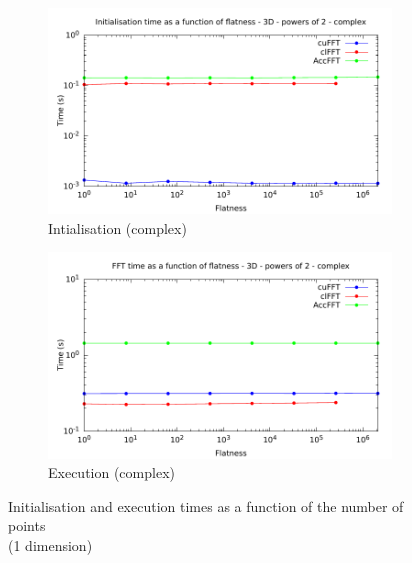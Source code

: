 \documentclass[12pt, a4paper]{article}
\begin{document}
\begin{figure}[H]
\begin{subfigure}{.5\textwidth}
\label{FFT1DRE}
\end{subfigure}\\
\begin{subfigure}{.5\textwidth}
\centering
\includegraphics[width=.9\linewidth]{graphs/flatness-c-init.pdf}
\caption{Intialisation (complex)}
\label{FFT1DCI}
\end{subfigure}%
\begin{subfigure}{.5\textwidth}
\centering
\includegraphics[width=.9\linewidth]{graphs/flatness-c-exec.pdf}
\caption{Execution (complex)}
\label{FFT1DCE}
\end{subfigure}
\caption{Initialisation and execution times as a function of the number of points\\(1 dimension)}
\label{FFT1D}
\end{figure}
\end{document}
